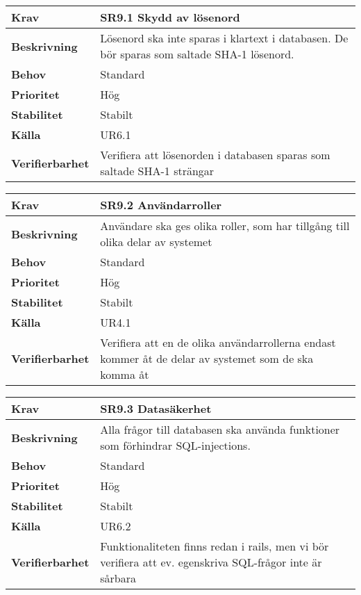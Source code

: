 \documentclass[a4paper, twoside, 11pt, titlepage]{article}
\begin{document}
\begin{tabular} { p{2.6cm} p{12.5cm} }
	\hline
	\sffamily\textbf{Krav} & SR9.1 Skydd av lösenord  \\
	\hline
	\sffamily\textbf{Beskrivning} & Lösenord ska inte sparas i klartext i databasen. De bör sparas som saltade SHA-1 lösenord.  \\
	\hline
	\sffamily\textbf{Behov} & Standard  \\
	\hline
	\sffamily\textbf{Prioritet} & Hög  \\
	\hline
	\sffamily\textbf{Stabilitet} & Stabilt  \\
	\hline
	\sffamily\textbf{Källa} & UR6.1  \\
	\hline
	\sffamily\textbf{Verifierbarhet} & Verifiera att lösenorden i databasen sparas som saltade SHA-1 strängar  \\
	\hline
\end{tabular}
\vspace{6mm}

\begin{tabular} { p{2.6cm} p{12.5cm} }
	\hline
	\sffamily\textbf{Krav} & SR9.2 Användarroller  \\
	\hline
	\sffamily\textbf{Beskrivning} & Användare ska ges olika roller, som har tillgång till olika delar av systemet  \\
	\hline
	\sffamily\textbf{Behov} & Standard  \\
	\hline
	\sffamily\textbf{Prioritet} & Hög  \\
	\hline
	\sffamily\textbf{Stabilitet} & Stabilt  \\
	\hline
	\sffamily\textbf{Källa} & UR4.1  \\
	\hline
	\sffamily\textbf{Verifierbarhet} & Verifiera att en de olika användarrollerna endast kommer åt de delar av systemet som de ska komma åt  \\
	\hline
\end{tabular}
\vspace{6mm}

\begin{tabular} { p{2.6cm} p{12.5cm} }
	\hline
	\sffamily\textbf{Krav} & SR9.3 Datasäkerhet  \\
	\hline
	\sffamily\textbf{Beskrivning} & Alla frågor till databasen ska använda funktioner som förhindrar SQL-injections.  \\
	\hline
	\sffamily\textbf{Behov} & Standard  \\
	\hline
	\sffamily\textbf{Prioritet} & Hög  \\
	\hline
	\sffamily\textbf{Stabilitet} & Stabilt  \\
	\hline
	\sffamily\textbf{Källa} & UR6.2  \\
	\hline
	\sffamily\textbf{Verifierbarhet} & Funktionaliteten finns redan i rails, men vi bör verifiera att ev. egenskriva SQL-frågor inte är sårbara  \\
	\hline
\end{tabular}
\vspace{6mm}
\end{document}
